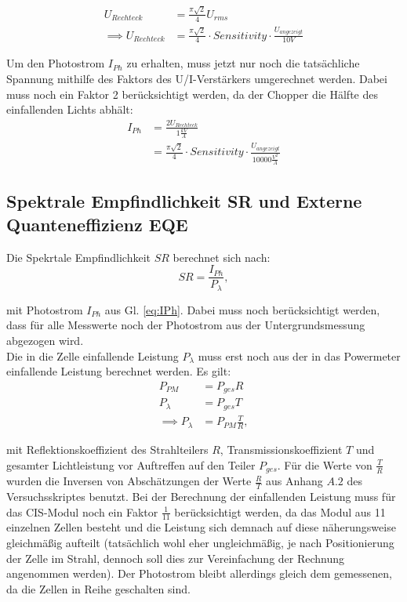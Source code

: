 \begin{align}
U_{Rechteck} &= \frac{\pi \sqrt{2}}{4} U_{rms} \\
\implies U_{Rechteck} &= \frac{\pi \sqrt{2}}{4} \cdot Sensitivity \cdot \frac{U_{angezeigt}}{10V}
\end{align}

Um den Photostrom $I_{Ph}$ zu erhalten, muss jetzt nur noch die tatsächliche Spannung mithilfe des Faktors des U/I-Verstärkers umgerechnet werden. 
Dabei muss noch ein Faktor 2 berücksichtigt werden, da der Chopper die Hälfte des einfallenden Lichts abhält:\\

\begin{align}
I_{Ph} &= \frac{2U_{Rechteck}}{1 \frac{kV}{A}} \nonumber \\
 &= \frac{\pi \sqrt{2}}{4} \cdot Sensitivity \cdot \frac{U_{angezeigt}}{10000 \frac{V^2}{A}}
\label{eq:IPh}
\end{align}


\subsection{Spektrale Empfindlichkeit SR und Externe Quanteneffizienz EQE}

Die Spekrtale Empfindlichkeit $SR$ berechnet sich nach:
\begin{equation}
SR = \frac{I_{Ph}}{P_\lambda},
\end{equation}

mit Photostrom $I_{Ph}$ aus Gl. \ref{eq:IPh}. Dabei muss noch berücksichtigt werden, dass für alle Messwerte noch der Photostrom aus der
Untergrundsmessung abgezogen wird. \\
Die in die Zelle einfallende Leistung $P_{\lambda}$ muss erst noch aus der in das Powermeter einfallende Leistung berechnet werden. Es gilt:
\begin{align}
P_{PM} &= P_{ges} R \nonumber \\
P_{\lambda} &= P_{ges} T \nonumber \\
\implies P_{\lambda} &= P_{PM} \frac{T}{R},
\end{align}

mit Reflektionskoeffizient des Strahlteilers $R$, Transmissionskoeffizient $T$ und gesamter Lichtleistung vor Auftreffen auf den Teiler $P_{ges}$.
Für die Werte von $\frac{T}{R}$ wurden die Inversen von Abschätzungen der Werte $\frac{R}{T}$ aus Anhang $A.2$ des Versuchsskriptes benutzt. Bei der 
Berechnung der einfallenden Leistung muss für das CIS-Modul noch ein Faktor $\frac{1}{11}$ berücksichtigt werden, da das Modul aus 11 
einzelnen Zellen besteht und die Leistung sich demnach auf diese näherungsweise gleichmäßig aufteilt (tatsächlich wohl eher ungleichmäßig, 
je nach Positionierung der Zelle im Strahl, dennoch soll dies zur Vereinfachung der Rechnung angenommen werden). Der Photostrom bleibt 
allerdings gleich dem gemessenen, da die Zellen in Reihe geschalten sind.

